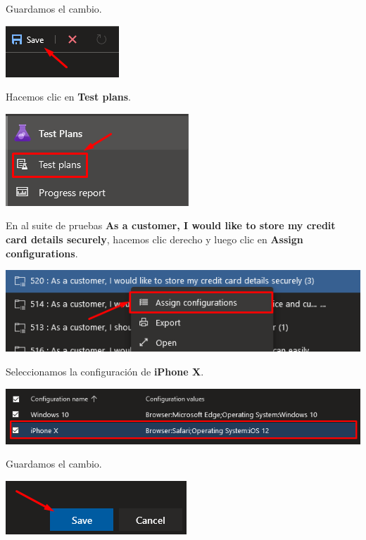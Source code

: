 \documentclass{elsarticle}
\begin{document}
Guardamos el cambio.
\begin{center}
	\includegraphics{img/Screenshot_41.png}
\end{center}

Hacemos clic en \textbf{Test plans}.
\begin{center}
	\includegraphics{img/Screenshot_42.png}
\end{center}

En al suite de pruebas \textbf{As a customer, I would like to store my credit card details securely}, hacemos clic derecho y luego clic en \textbf{Assign configurations}.
\begin{center}
	\includegraphics[width=\columnwidth]{img/Screenshot_43.png}
\end{center}

Seleccionamos la configuración de \textbf{iPhone X}.
\begin{center}
	\includegraphics[width=\columnwidth]{img/Screenshot_44.png}
\end{center}

Guardamos el cambio.
\begin{center}
	\includegraphics{img/Screenshot_45.png}
\end{center}
\end{document}
